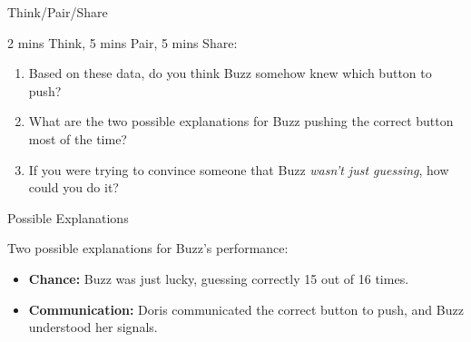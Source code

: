 \documentclass[slidestop,compress,mathserif]{beamer}
\begin{document}
\begin{frame}{Think/Pair/Share}
    \begin{block}{2 mins Think, 5 mins Pair, 5 mins Share:}
        \begin{enumerate}
            \item Based on these data, do you think Buzz somehow knew which button to push?
            \item What are the two possible explanations for Buzz pushing the correct button most of the time?
            \item If you were trying to convince someone that Buzz \emph{wasn't just guessing}, how could you do it?
        \end{enumerate}
    \end{block}
    \vspace{0.6cm}
    \begin{center}
    \end{center}
\end{frame}

\begin{frame}{Possible Explanations}
    \begin{block}{Two possible explanations for Buzz's performance:}
        \begin{itemize}
            \item \textbf{Chance:} Buzz was just lucky, guessing correctly 15 out of 16 times.
            \item \textbf{Communication:} Doris communicated the correct button to push, and Buzz understood her signals.
        \end{itemize}
    \end{block}
\end{frame}
\end{document}
